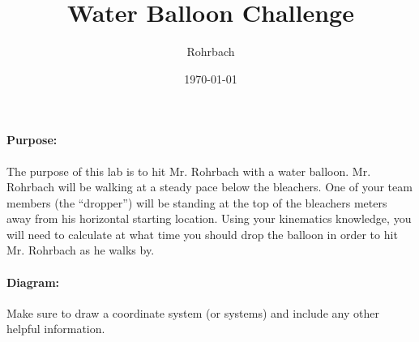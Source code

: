 \documentclass[10pt]{exam}
\title{Water Balloon Challenge}
\author{Rohrbach}
\date{\today}
\begin{document}
\maketitle

\paragraph{Purpose:}
  The purpose of this lab is to hit Mr. Rohrbach with a water balloon.  Mr. Rohrbach will be walking at a steady pace below the bleachers.  One of your team members (the ``dropper'') will be standing at the top of the bleachers \fillin{} meters away from his horizontal starting location.  Using your kinematics knowledge, you will need to calculate at what time you should drop the balloon in order to hit Mr. Rohrbach as he walks by. 

\paragraph{Diagram:}
  Make sure to draw a coordinate system (or systems) and include any other helpful information.
\end{document}
